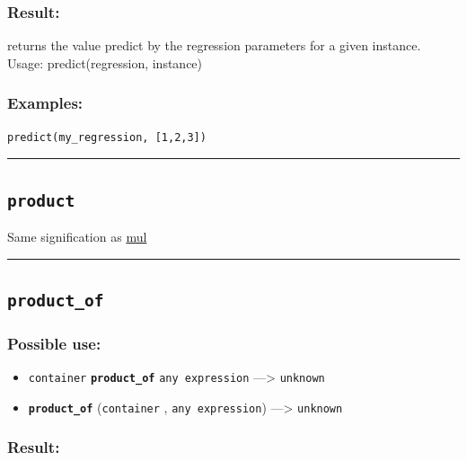 \documentclass[]{book}
\providecommand{\tightlist}{%
  \setlength{\itemsep}{0pt}\setlength{\parskip}{0pt}}
\theoremstyle{definition}
\theoremstyle{definition}
\theoremstyle{definition}
\theoremstyle{remark}
\begin{document}
\subsubsection{Result:}\label{result-403}

returns the value predict by the regression parameters for a given
instance. Usage: predict(regression, instance)

\subsubsection{Examples:}\label{examples-290}

\begin{verbatim}
predict(my_regression, [1,2,3]) 
\end{verbatim}

\begin{center}\rule{0.5\linewidth}{\linethickness}\end{center}

\subsection{\texorpdfstring{\texttt{product}}{product}}\label{product}

Same signification as \href{operators-i-to-m.html\#mul}{mul}

\begin{center}\rule{0.5\linewidth}{\linethickness}\end{center}

\subsection{\texorpdfstring{\texttt{product\_of}}{product\_of}}\label{product_of}

\subsubsection{Possible use:}\label{possible-use-418}

\begin{itemize}
\tightlist
\item
  \texttt{container} \textbf{\texttt{product\_of}}
  \texttt{any\ expression} ---\textgreater{} \texttt{unknown}
\item
  \textbf{\texttt{product\_of}} (\texttt{container} ,
  \texttt{any\ expression}) ---\textgreater{} \texttt{unknown}
\end{itemize}

\subsubsection{Result:}\label{result-404}
\end{document}
